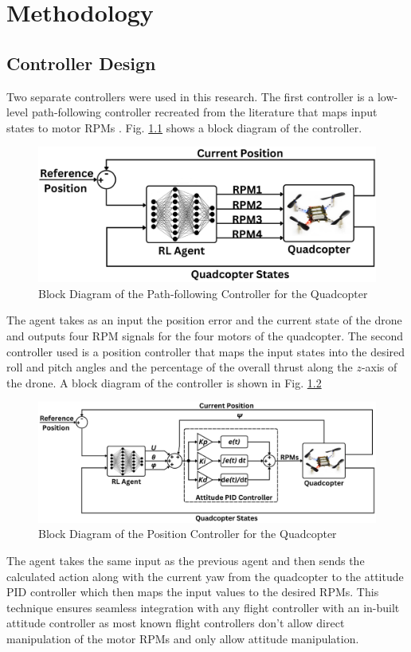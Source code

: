 \chapter{Methodology}
    \section{Controller Design}
    Two separate controllers were used in this research. The first controller is a low-level path-following controller recreated from the literature that maps input states to motor RPMs \cite{Mokhtar}. Fig. \ref{mokhtar_cont} shows a block diagram of the controller.
    \begin{figure}[H]
            \centering
            \includegraphics[width=0.8\linewidth]{Images/mokhtar.png}
            \caption{Block Diagram of the Path-following Controller for the Quadcopter}
            \label{mokhtar_cont}
    \end{figure}
    The agent takes as an input the position error and the current state of the drone and outputs four RPM signals for the four motors of the quadcopter.\clearpage
    The second controller used is a position controller that maps the input states into the desired roll and pitch angles and the percentage of the overall thrust along the $z$-axis of the drone. A block diagram of the controller is shown in Fig. \ref{mahran_cont}
    \begin{figure}[H]
            \centering
            \includegraphics[width=1\linewidth]{Images/mahran.png}
            \caption{Block Diagram of the Position Controller for the Quadcopter}
            \label{mahran_cont}
    \end{figure}
     The agent takes the same input as the previous agent and then sends the calculated action along with the current yaw from the quadcopter to the attitude PID controller which then maps the input values to the desired RPMs. This technique ensures seamless integration with any flight controller with an in-built attitude controller as most known flight controllers don't allow direct manipulation of the motor RPMs and only allow attitude manipulation. \clearpage
